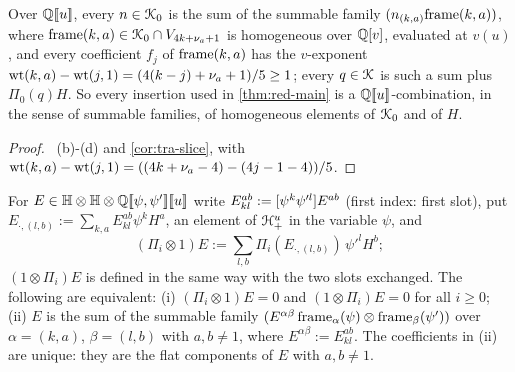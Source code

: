 \begin{lem}
\label{lem:tra-coeff}
Over $\mathbb{Q}[\![ u ]\!]$, every $n\in\mathcal{K}_{0}$ is the sum of the summable family $(n_{(k,a)}\mathrm{frame}(k,a))$, where $\mathrm{frame}(k,a)\in\mathcal{K}_{0}\cap V_{4k+\nu_a+1}$ is homogeneous over $\mathbb{Q}[v]$, evaluated at $v(u)$, and every coefficient $f_j$ of $\mathrm{frame}(k,a)$ has the $v$-exponent $\operatorname{wt}(k,a)-\operatorname{wt}(j,1) = (4(k-j)+\nu_a+1)/5\geq 1$; every $q\in\mathcal{K}$ is such a sum plus $\Pi_0(q)H$. So every insertion used in \cref{thm:red-main} is a $\mathbb{Q}[\![ u ]\!]$-combination, in the sense of summable families, of homogeneous elements of $\mathcal{K}_{0}$ and of $H$.
\end{lem}

\begin{proof}
~(b)-(d) and \cref{cor:tra-slice}, with $\operatorname{wt}(k,a)-\operatorname{wt}(j,1) = ((4k+\nu_a-4)-(4j-1-4))/5$.
\end{proof}

\begin{lem}
\label{lem:tra-twoslot}
For $E\in\mathbb{H}\otimes\mathbb{H}\otimes\mathbb{Q}[\![ \psi,\psi' ]\!][\![ u ]\!]$ write $E^{ab}_{kl} := [\psi^k\psi'^l]E^{ab}$ (first index: first slot), put $E_{\cdot,(l,b)} := \sum_{k,a}E^{ab}_{kl}\psi^kH^a$, an element of $\mathcal{H}^u_+$ in the variable $\psi$, and
\[
(\Pi_i\otimes 1)E := \sum_{l,b}\Pi_i(E_{\cdot,(l,b)})\,\psi'^lH^b ;
\]
$(1\otimes\Pi_i)E$ is defined in the same way with the two slots exchanged. The following are equivalent: (i) $(\Pi_i\otimes 1)E = 0$ and $(1\otimes\Pi_i)E = 0$ for all $i\geq 0$; (ii) $E$ is the sum of the summable family $(E^{\alpha\beta}\,\mathrm{frame}_\alpha(\psi)\otimes\mathrm{frame}_\beta(\psi'))$ over $\alpha = (k,a)$, $\beta = (l,b)$ with $a,b\neq 1$, where $E^{\alpha\beta} := E^{ab}_{kl}$. The coefficients in (ii) are unique: they are the flat components of $E$ with $a,b\neq 1$.
\end{lem}

